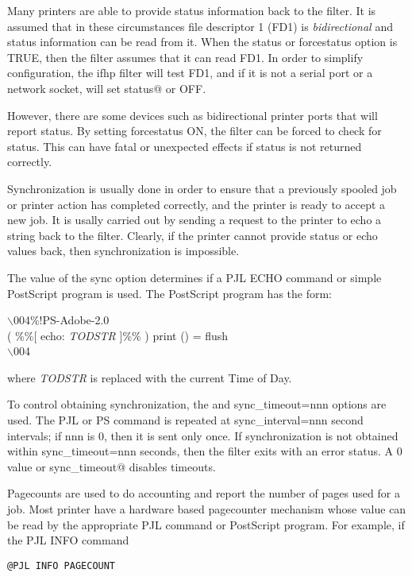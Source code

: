 \documentclass[a4paper]{article}
\begin{document}
Many printers are able to provide status information back to the
filter.
It is assumed that in these circumstances file descriptor 1
(FD1)
is
{\itshape bidirectional\/}
and status information can be read from it.
When the
{\ttfamily status}
or
{\ttfamily forcestatus}
option is TRUE,
then the filter assumes that it can read FD1.
In order to simplify configuration,
the
{\ttfamily ifhp}
filter will test FD1, and if it is not
a serial port or a network socket, will set
{\ttfamily status@}
or OFF.

However, there are some devices such as bidirectional printer ports
that will report status.
By setting
{\ttfamily forcestatus}
ON,
the filter can be forced to check for status.
This can have fatal or unexpected effects if status is not returned
correctly.

Synchronization is usually done in order to ensure that a previously
spooled job or printer action has completed correctly,
and the printer is ready to accept a new job.
It is usally carried out by sending a request to the printer to
echo a string back to the filter.
Clearly,
if the printer cannot provide status or echo values back,
then synchronization is impossible.

The value of the
{\ttfamily sync} option determines if a PJL ECHO command or simple PostScript 
program is used.
The PostScript program has the form:
\begin{tscreen}
$\backslash$004\%!PS-Adobe-2.0\\ 
( \%\%{[} echo: {\itshape TODSTR\/} ]\%\% ) print () = flush\\ 
$\backslash$004
\end{tscreen}


where {\itshape TODSTR\/} is replaced with the current Time of Day.

To control obtaining synchronization,
the
and
{\ttfamily sync\_timeout=nnn}
options are used.
The PJL or PS command is repeated at
{\ttfamily sync\_interval=nnn}
second intervals; if nnn is 0, then it is sent only once.
If synchronization is not obtained within
{\ttfamily sync\_timeout=nnn}
seconds, then the filter exits with an error status.
A 0 value or
{\ttfamily sync\_timeout@}
disables timeouts.

Pagecounts are used to do accounting and report the number of pages
used for a job.
Most printer have a hardware based pagecounter mechanism whose value
can be read by the appropriate PJL command or PostScript program.
For example, if the PJL INFO command
\begin{tscreen}
\begin{verbatim}
@PJL INFO PAGECOUNT
\end{verbatim}
\end{tscreen}
\end{document}
